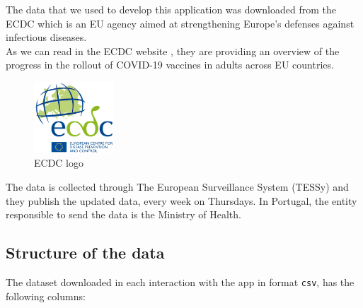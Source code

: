 The data that we used to develop this application was downloaded from the \ac{ECDC} which is an \ac{EU} agency aimed at strengthening Europe's defenses against infectious diseases.
\\
As we can read in the \ac{ECDC} website \cite{dataDownload}, they are providing an overview of the progress in the rollout of COVID-19 vaccines in adults across \ac{EU} countries.
\begin{figure}[h]
\centering %
\includegraphics[width=3cm]{images/ecdc.png} 

\caption{ECDC logo}
\label{figura:qualquernome}
\end{figure}

The data is collected through The European Surveillance System (TESSy) and they publish the updated data, every week on Thursdays. In Portugal, the entity responsible to send the data is the Ministry of Health.

\subsection{Structure of the data}
The dataset  downloaded in each interaction with the app in format \verb!csv!, has the following columns:

